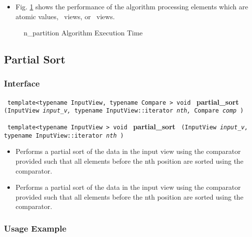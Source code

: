 \begin{itemize}
\item
Fig. \ref{fig:npart-alg-exec-exper}
shows the performance of the algorithm processing
elements which are atomic values, \stl\ views, or \stapl\ views.
\end{itemize}

\begin{figure}[p]
\caption{n\_partition Algorithm Execution Time}
\label{fig:npart-alg-exec-exper}
\end{figure}


\subsection{Partial Sort} \label{sec-sort-partial}

\subsubsection{Interface} %

\noindent
\texttt{%
template<typename InputView, typename Compare >
\newline
void 
}
\newline
\textbf{partial\_sort}%
\texttt{%
(InputView 
\textit{input\_v,}%
typename InputView::iterator 
\textit{nth,}%
Compare 
\textit{comp}%
)
}
\vspace{0.4cm}
 
\noindent
\texttt{%
template<typename InputView >
\newline
void 
}
\newline
\textbf{partial\_sort}%
\texttt{%
(InputView 
\textit{input\_v,}%
typename InputView::iterator 
\textit{nth}%
)
}

\begin{itemize}
\item
Performs a partial sort of the data in the input view using the comparator provided such that all elements before the nth position are sorted using the comparator. 
\item
Performs a partial sort of the data in the input view using the comparator provided such that all elements before the nth position are sorted using the comparator. 
\end{itemize}

\subsubsection{Usage Example} %

